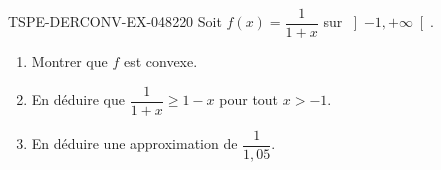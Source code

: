 \begin{exercice}{TSPE-DERCONV-EX-048}{2}{20}
Soit $f(x) = \dfrac{1}{1+x}$ sur $\left]-1, +\infty\right[$.
\begin{enumerate}
  \item Montrer que $f$ est convexe.
  \item En déduire que $\dfrac{1}{1+x} \geq 1 - x$ pour tout $x > -1$.
  \item En déduire une approximation de $\dfrac{1}{1{,}05}$.
\end{enumerate}

\end{exercice}
